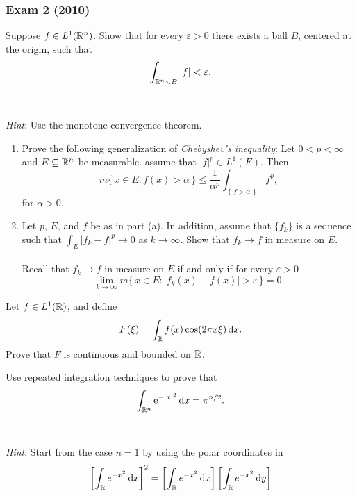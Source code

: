 \subsubsection{Exam 2 (2010)}
\setcounter{exercise}{0}
\setcounter{equation}{0}

\begin{problem}
  Suppose \(f\in L^1(\mathbb{R}^n)\). Show that for every \(\varepsilon>0\) there
  exists a ball \(B\), centered at the origin, such that
  \[
    \int_{\mathbb{R}^n\smallsetminus B}|f|<\varepsilon.
  \]
  \\\\
  \emph{Hint}: Use the monotone convergence theorem.
\end{problem}
\begin{solution}
\end{solution}
\begin{problem}
  \hfill
  \begin{enumerate}[label=(\alph*)]
  \item Prove the following generalization of \emph{Chebyshev's
      inequality}: Let \(0<p<\infty\) and \(E\subseteq\mathbb{R}^n\) be
    measurable. assume that \(|f|^p\in L^1(E)\). Then
    \[
      m\bigl\{\,x\in E:f(x)>\alpha\,\bigr\}
      \leq\frac{1}{\alpha^p}\int_{\left\{\,f>\alpha\,\right\}}f^p,
    \]
    for \(\alpha>0\).
  \item Let \(p\), \(E\), and \(f\) be as in part (a). In addition, assume
    that \(\{f_k\}\) is a sequence such that \(\int_E|f_k-f|^p\to 0\) as
    \(k\to\infty\). Show that \(f_k\to f\) in measure on \(E\).
    \\\\
    Recall that \(f_k\to f\) in measure on \(E\) if and only if for every
    \(\varepsilon>0\)
    \[
      \lim_{k\to\infty}m\bigl\{\,x\in
      E:|f_k(x)-f(x)|>\varepsilon\,\bigr\}=0.
    \]
\end{enumerate}
\end{problem}
\begin{solution}
\end{solution}

\begin{problem}
  Let \(f\in L^1(\mathbb{R})\), and define
  \[
    F(\xi)=\int_{\mathbb{R}} f(x)\cos(2\pi x\xi)\mathop{}\!\mathrm{d} x.
  \]
  Prove that \(F\) is continuous and bounded on \(\mathbb{R}\).
\end{problem}
\begin{solution}
\end{solution}

\begin{problem}
  Use repeated integration techniques to prove that
  \[
    \int_{\mathbb{R}^n} \mathrm{e}^{-|x|^2}\mathop{}\!\mathrm{d} x=\pi^{n/2}.
  \]
  \\\\
  \emph{Hint}: Start from the case \(n=1\) by using the polar coordinates
  in
  \[
    \left[\int_{\bbR} e^{-x^2}\diff x\right]^2=%
    \left[\int_{\bbR} e^{-x^2}\diff x\right]%
    \left[\int_{\bbR} e^{-x^2}\diff y\right]%
  \]
\end{problem}
\begin{solution}
\end{solution}

\begin{problem}
\end{problem}
\begin{solution}
\end{solution}

